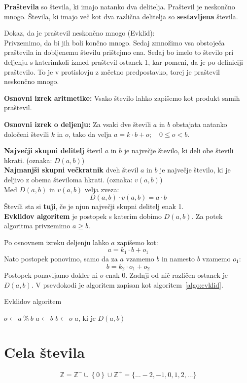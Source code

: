 \documentclass[a4paper,oneside,12pt,fleqn]{article}
\def\Z{\ensuremath{\mathbb Z}}
\newcommand\krat\cdot
\numberwithin{equation}{section}
\begin{document}
\textbf{Praštevila} so števila, ki imajo natanko dva delitelja. Praštevil je neskončno mnogo.
Števila, ki imajo več kot dva različna delitelja so \textbf{sestavljena} števila. 

Dokaz, da je praštevil neskončno mnogo (Evklid): \\
Privzemimo, da bi jih boli končno mnogo. Sedaj zmnožimo vsa obstoječa praštevila in dobljenemu
številu prištejmo ena. Sedaj bo imelo to število pri deljenju s katerimkoli izmed praštevil ostanek
1, kar pomeni, da je po definiciji praštevilo. To je v protislovju z začetno predpostavko, torej je
praštevil neskončno mnogo.

\textbf{Osnovni izrek aritmetike:} Vsako število lahko zapišemo kot produkt
samih praštevil.

\textbf{Osnovni izrek o deljenju:} Za vsaki dve števili $a$ in $b$ obstajata
natanko določeni števili $k$ in $o$, tako da velja $a = k \krat b+ o; \quad 0 \leq o < b$.

\textbf{Največji skupni delitelj} števil $a$ in $b$ je največje število, ki deli obe števili
hkrati. (oznaka: $D(a,b)$) \\
\textbf{Najmanjši skupni večkratnik} dveh števil $a$ in $b$ je največje število, ki je deljivo z obema
številoma hkrati. (oznaka: $v(a,b)$) \\
Med $D(a,b)$ in $v(a,b)$ velja zveza: 
\[ D(a,b) \krat v(a,b) = a \krat b \]
Števili sta si \textbf{tuji}, če je njun največji skupni delitelj enak 1. \\
\textbf{Evklidov algoritem} je postopek s katerim dobimo $D(a,b)$. Za potek algoritma privzemimo $a
\ge b$.

Po osnovnem izreku  deljenju lahko $a$ zapišemo kot:
\[ a = k_1\krat b + o_1 \]
Nato postopek ponovimo, samo da za $a$ vzamemo $b$ in namesto $b$ vzamemo $o_1$:
\[ b = k_2\krat o_1 + o_2 \]
Postopek ponavljamo dokler ni $o$ enak 0. Zadnji od nič različen
ostanek je $D(a,b)$. V psevdokodi je algoritem zapisan kot algoritem~\ref{algo:evklid}.

\begin{algorithm}[h]
  \caption{Evklidov algoritem}\label{algo:evklid}
  \begin{algorithmic}[1]
        \State $o \gets a\ \%\ b$
        \State $a \gets b$
        \State $b \gets o$
    \EndWhile
    \State \Return $a$, ki je $D(a, b)$
  \end{algorithmic}
\end{algorithm}

\section{Cela števila}
\label{sec:cela}
\[ \Z = \Z^- \cup \left\{ 0 \right\} \cup \Z^+ = \{ \ldots -2, -1, 0, 1, 2, \ldots \} \]
\end{document}
